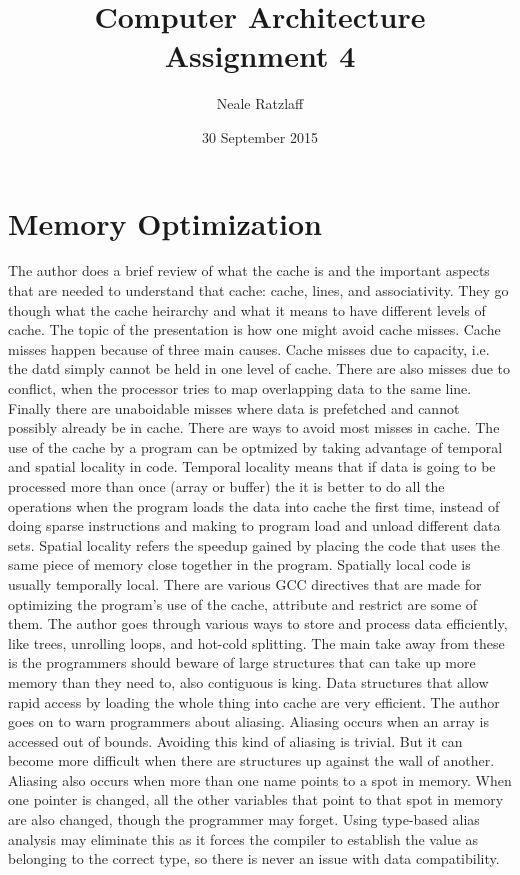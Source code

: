 \documentclass[letterpaper,10pt,titlepage]{article}
\title{Computer Architecture Assignment 4}
\author{Neale Ratzlaff}
\date{30 September 2015}
\begin{document}
\maketitle
\pagebreak
\section{Memory Optimization}
The author does a brief review of what the cache is and the important aspects that are needed to understand that cache: 
    cache, lines, and associativity. They go though what the cache heirarchy and what it means to have different levels of cache. 
    The topic of the presentation is how one might avoid cache misses. Cache misses happen because of three main causes. Cache misses 
    due to capacity, i.e. the datd simply cannot be held in one level of cache. There are also misses due to conflict, when the processor tries 
    to map overlapping data to the same line. Finally there are unaboidable misses where data is prefetched and cannot possibly already 
    be in cache. There are ways to avoid most misses in cache. The use of the cache by a program can be optmized by taking advantage of temporal 
    and spatial locality in code. Temporal locality means that if data is going to be processed more than once (array or buffer) the it is better 
    to do all the operations when the program loads the data into cache the first time, instead of doing sparse instructions and making to program 
    load and unload different data sets. Spatial locality refers the speedup gained by placing the code that uses the same piece of memory close 
    together in the program. Spatially local code is usually temporally local. There are various GCC directives that are made for optimizing the 
    program's use of the cache, attribute and restrict are some of them. The author goes through various ways to store and process data 
    efficiently, like trees, unrolling loops, and hot-cold splitting. The main take away from these is the programmers should beware of 
    large structures that can take up more memory than they need to, also contiguous is king. Data structures that allow rapid access by loading 
    the whole thing into cache are very efficient. The author goes on to warn programmers about aliasing. Aliasing occurs when an array is accessed 
    out of bounds. Avoiding this kind of aliasing is trivial. But it can become more difficult when there are structures up against the wall of 
    another. Aliasing also occurs when more than one name points to a spot in memory. When one pointer is changed, all the other variables that 
    point to that spot in memory are also changed, though the programmer may forget. Using type-based alias analysis may eliminate this as 
    it forces the compiler to establish the value as belonging to the correct type, so there is never an issue with data compatibility. 
\end{document}

